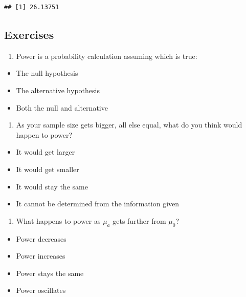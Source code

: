 \documentclass[]{article}
\begin{document}
\begin{verbatim}
## [1] 26.13751
\end{verbatim}

\subsection{Exercises}\label{exercises-10}

\begin{enumerate}
\def\labelenumi{\arabic{enumi}.}
\itemsep1pt\parskip0pt
\item
  Power is a probability calculation assuming which is true:
\end{enumerate}

\begin{itemize}
\itemsep1pt\parskip0pt
\item
  The null hypothesis
\item
  The alternative hypothesis
\item
  Both the null and alternative
\end{itemize}

\begin{enumerate}
\def\labelenumi{\arabic{enumi}.}
\setcounter{enumi}{1}
\itemsep1pt\parskip0pt
\item
  As your sample size gets bigger, all else equal, what do you think
  would happen to power?
\end{enumerate}

\begin{itemize}
\itemsep1pt\parskip0pt
\item
  It would get larger
\item
  It would get smaller
\item
  It would stay the same
\item
  It cannot be determined from the information given
\end{itemize}

\begin{enumerate}
\def\labelenumi{\arabic{enumi}.}
\setcounter{enumi}{2}
\itemsep1pt\parskip0pt
\item
  What happens to power as $\mu_a$ gets further from $\mu_0$?
\end{enumerate}

\begin{itemize}
\itemsep1pt\parskip0pt
\item
  Power decreases
\item
  Power increases
\item
  Power stays the same
\item
  Power oscillates
\end{itemize}
\end{document}
